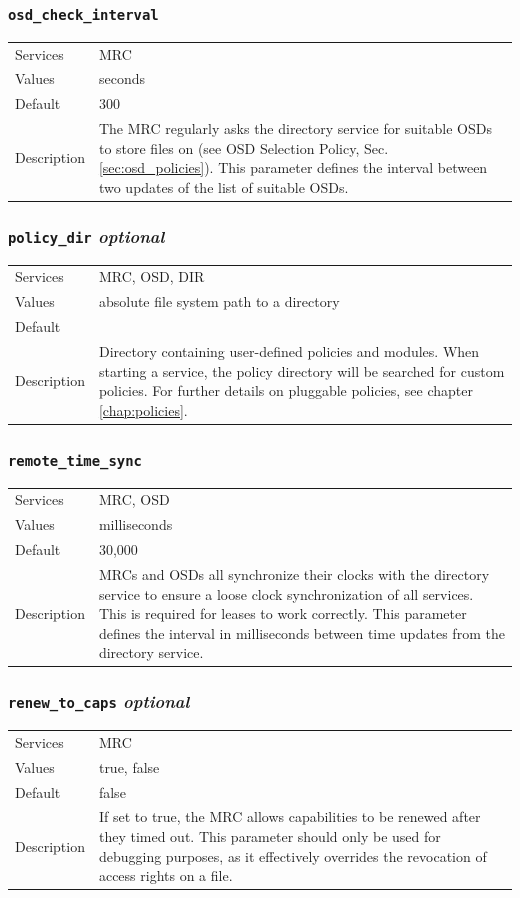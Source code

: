 \documentclass[a4paper,10pt]{book}
\begin{document}
\subsubsection{\texttt{osd\_check\_interval}}
\begin{tabular}{lp{10cm}}
 Services & MRC\\
 Values   & seconds \\
 Default  & 300\\
 Description & The MRC regularly asks the directory service for suitable OSDs to store files on (see OSD Selection Policy, Sec. \ref{sec:osd_policies}). This parameter defines the interval between two updates of the list of suitable OSDs.
\end{tabular}

\subsubsection{\texttt{policy\_dir} \textit{optional}}
\begin{tabular}{lp{10cm}}
 Services & MRC, OSD, DIR\\
 Values   & absolute file system path to a directory\\
 Default  & \\
 Description & Directory containing user-defined policies and modules. When starting a service, the policy directory will be searched for custom policies. For further details on pluggable policies, see chapter \ref{chap:policies}.
\end{tabular}

\subsubsection{\texttt{remote\_time\_sync}}
\begin{tabular}{lp{10cm}}
 Services & MRC, OSD\\
 Values   & milliseconds \\
 Default  & 30,000\\
 Description & MRCs and OSDs all synchronize their clocks with the directory service to ensure a loose clock synchronization of all services. This is required for leases to work correctly. This parameter defines the interval in milliseconds between time updates from the directory service.
\end{tabular}

\subsubsection{\texttt{renew\_to\_caps} \textit{optional}}
\begin{tabular}{lp{10cm}}
 Services & MRC\\
 Values   & true, false\\
 Default  & false\\
 Description & If set to true, the MRC allows capabilities to be renewed after they timed out. This parameter should only be used for debugging purposes, as it effectively overrides the revocation of access rights on a file.
\end{tabular}
\end{document}
